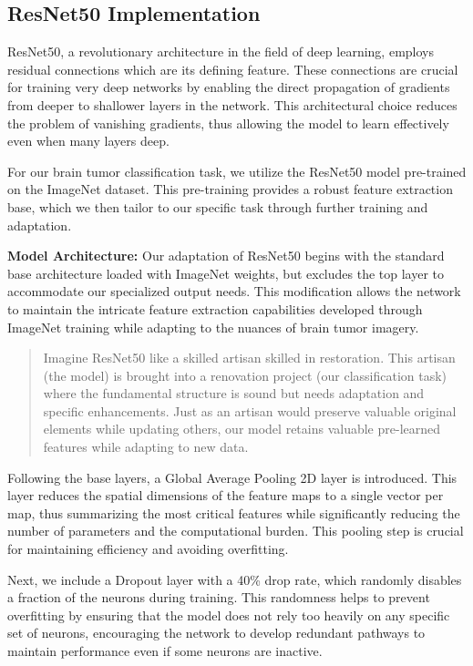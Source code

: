 \subsection{ResNet50 Implementation}\label{resnet50}

ResNet50, a revolutionary architecture in the field of deep learning, employs residual connections which are its defining feature. These connections are crucial for training very deep networks by enabling the direct propagation of gradients from deeper to shallower layers in the network. This architectural choice reduces the problem of vanishing gradients, thus allowing the model to learn effectively even when many layers deep.

For our brain tumor classification task, we utilize the ResNet50 model pre-trained on the ImageNet dataset. This pre-training provides a robust feature extraction base, which we then tailor to our specific task through further training and adaptation.

\textbf{Model Architecture:} Our adaptation of ResNet50 begins with the standard base architecture loaded with ImageNet weights, but excludes the top layer to accommodate our specialized output needs. This modification allows the network to maintain the intricate feature extraction capabilities developed through ImageNet training while adapting to the nuances of brain tumor imagery.

\begin{quote}
Imagine ResNet50 like a skilled artisan skilled in restoration. This artisan (the model) is brought into a renovation project (our classification task) where the fundamental structure is sound but needs adaptation and specific enhancements. Just as an artisan would preserve valuable original elements while updating others, our model retains valuable pre-learned features while adapting to new data.
\end{quote}

Following the base layers, a Global Average Pooling 2D layer is introduced. This layer reduces the spatial dimensions of the feature maps to a single vector per map, thus summarizing the most critical features while significantly reducing the number of parameters and the computational burden. This pooling step is crucial for maintaining efficiency and avoiding overfitting.

Next, we include a Dropout layer with a 40\% drop rate, which randomly disables a fraction of the neurons during training. This randomness helps to prevent overfitting by ensuring that the model does not rely too heavily on any specific set of neurons, encouraging the network to develop redundant pathways to maintain performance even if some neurons are inactive.

